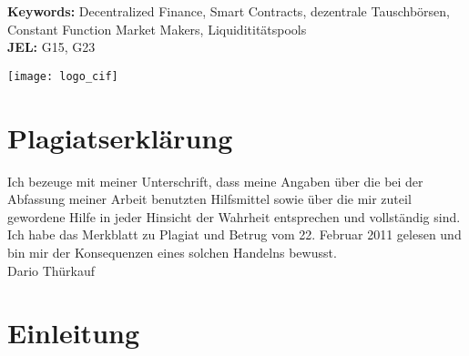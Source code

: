 \documentclass[12pt,a4paper,titlepage,oneside,english]{article}
\begin{document}

\vfill
\textbf{Keywords:} Decentralized Finance, Smart Contracts, dezentrale Tauschbörsen, Constant Function Market Makers, Liquidititätspools\\
\noindent\textbf{JEL:} G15, G23



\newpage
{}
\tableofcontents

\vfill
\begin{center}
\texttt{[image: logo\_cif]}
\end{center}
\singlespacing
\vspace{-1.5cm}
\section*{Plagiatserklärung}
Ich bezeuge mit meiner Unterschrift, dass meine Angaben über die bei der Abfassung meiner Arbeit benutzten Hilfsmittel sowie über die mir zuteil gewordene Hilfe in jeder Hinsicht der Wahrheit entsprechen und vollständig sind. Ich habe das Merkblatt zu Plagiat und Betrug vom 22. Februar 2011 gelesen und bin mir der Konsequenzen eines solchen Handelns bewusst.\\

Dario Thürkauf

\newpage
\onehalfspacing
{}



\section{Einleitung}
\end{document}
